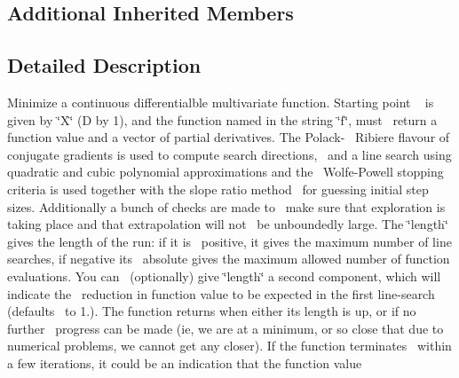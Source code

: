\subsection*{Additional Inherited Members}


\subsection{Detailed Description}
Minimize a continuous differentialble multivariate function. Starting point ~\newline
 is given by \char`\"{}\+X\char`\"{} (D by 1), and the function named in the string \char`\"{}f\char`\"{}, must~\newline
 return a function value and a vector of partial derivatives. The Polack-\/~\newline
 Ribiere flavour of conjugate gradients is used to compute search directions,~\newline
 and a line search using quadratic and cubic polynomial approximations and the~\newline
 Wolfe-\/\+Powell stopping criteria is used together with the slope ratio method~\newline
 for guessing initial step sizes. Additionally a bunch of checks are made to~\newline
 make sure that exploration is taking place and that extrapolation will not~\newline
 be unboundedly large. The \char`\"{}length\char`\"{} gives the length of the run\+: if it is~\newline
 positive, it gives the maximum number of line searches, if negative its~\newline
 absolute gives the maximum allowed number of function evaluations. You can~\newline
 (optionally) give \char`\"{}length\char`\"{} a second component, which will indicate the~\newline
 reduction in function value to be expected in the first line-\/search (defaults~\newline
 to 1.). The function returns when either its length is up, or if no further~\newline
 progress can be made (ie, we are at a minimum, or so close that due to~\newline
 numerical problems, we cannot get any closer). If the function terminates~\newline
 within a few iterations, it could be an indication that the function value~\newline
